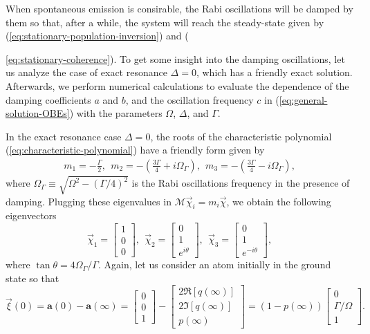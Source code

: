 When spontaneous emission is consirable, the Rabi oscillations will be damped by them so that, after a while, the system will reach the steady-state given by (\ref{eq:stationary-population-inversion}) and ({\ref{eq:stationary-coherence}). To get some insight into the damping oscillations, let us analyze the case of exact resonance $ \Delta = 0 $, which has a friendly exact solution. Afterwards, we perform numerical calculations to evaluate the dependence of the damping coefficients $ a $ and $ b $, and the oscillation frequency $ c $ in (\ref{eq:general-solution-OBEs}) with the parameters $ \Omega $, $ \Delta $, and $ \Gamma $.

In the exact resonance case $ \Delta = 0 $, the roots of the characteristic polynomial (\ref{eq:characteristic-polynomial}) have a friendly form given by
\begin{gather}
	m_1 = -\frac{\Gamma}{2},\ \ m_2 = - \left(\frac{3 \Gamma}{4} + i \Omega_{\Gamma} \right),\ \ m_3 = - \left(\frac{3 \Gamma}{4} - i \Omega_{\Gamma} \right),
	\label{eq:eigenvalues-damped-Rabi-oscillations}
\end{gather}
where $ \Omega_{\Gamma} \equiv \sqrt{\Omega^2 - (\Gamma / 4)^2} $ is the Rabi oscillations frequency in the presence of damping. Plugging these eigenvalues in $ \mathcal{M}\vec{\chi}_i = m_i \vec{\chi} $, we obtain the following eigenvectors
\begin{equation}
	 \vec{\chi}_1 = \left[ \begin{matrix} 1 \\ 0 \\ 0 \end{matrix} \right],\ \
	 \vec{\chi}_2 = \left[ \begin{matrix} 0 \\ 1 \\ e^{i\theta} \end{matrix} \right],\ \
	 \vec{\chi}_3 = \left[ \begin{matrix} 0 \\ 1 \\ e^{-i\theta} \end{matrix} \right],
	\label{eq:eigenvectors-damped-Rabi-oscillations}
\end{equation}
where $ \tan \theta = 4 \Omega_{\Gamma} / \Gamma $. Again, let us consider an atom initially in the ground state so that
\begin{equation}
	\vec{\xi}(0) = \mathbf{a}(0) - \mathbf{a}(\infty) = \left[ \begin{matrix} 0 \\ 0 \\ 1 \end{matrix} \right] - \left[ \begin{matrix} 2\Re[q(\infty)] \\ 2\Im[q(\infty)] \\ p(\infty) \end{matrix} \right] = (1 - p(\infty)) \left[ \begin{matrix} 0 \\ \Gamma / \Omega \\ 1 \end{matrix} \right].

\end{equation}}
